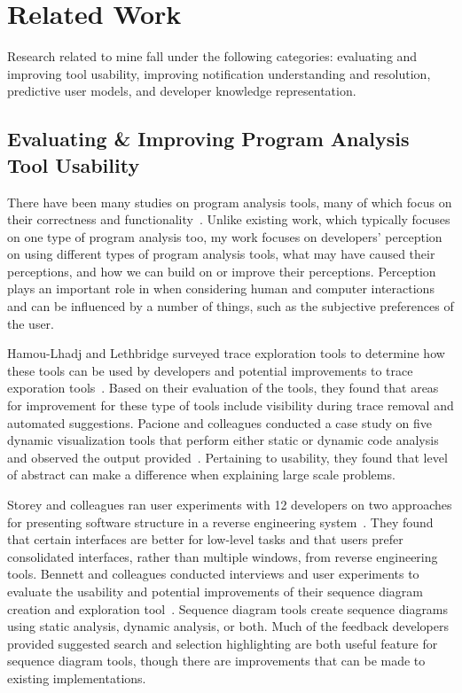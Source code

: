 \documentclass{llncs}
\begin{document}
\section{Related Work}
Research related to mine fall under the following categories: evaluating and improving tool usability, improving notification understanding and resolution, predictive user models, and developer knowledge representation.

\subsection{Evaluating \& Improving Program Analysis Tool Usability}

There have been many studies on program analysis tools, many of which focus on
their correctness and functionality~\cite{Ayewah:2008:FindBugs,Bessey:2010:Coverity,dugan2000developing,luk2005pin}.
Unlike existing work, which typically focuses on one type of program analysis too, my work focuses on developers' perception on 
using different types of program analysis tools, what may have caused their perceptions, and how we can build on or improve their perceptions. 
Perception plays an important role in when considering human and computer interactions~\cite{Dastani:2002:Perception} and
can be influenced by a number of things, such as the subjective preferences of
the user.

Hamou-Lhadj and Lethbridge surveyed trace exploration tools to determine how these tools 
can be used by developers and potential improvements to trace exporation tools~\cite{hamou2004survey}. 
Based on their evaluation of the tools, they found that areas 
for improvement for these type of tools include visibility during trace removal and automated suggestions.
Pacione and colleagues conducted a case study on five dynamic visualization tools that perform either static or dynamic code analysis and observed the output provided~\cite{pacione2003comparative}. Pertaining to usability, they found that level of abstract can make a difference when explaining large scale problems.

Storey and colleagues ran user experiments with 12 developers on two approaches for presenting software structure in a reverse engineering system~\cite{storey1997rigi}. They found that certain interfaces are better for low-level tasks and that users prefer consolidated interfaces, rather than multiple windows, from reverse engineering tools.
Bennett and colleagues conducted interviews and user experiments to evaluate the usability and potential improvements of their sequence diagram creation and exploration tool~\cite{bennett2008survey}. Sequence diagram tools create sequence diagrams using static analysis, dynamic analysis, or both.
Much of the feedback developers provided suggested search and selection highlighting are both useful feature for sequence diagram tools, though there are improvements that can be made to existing implementations.
\end{document}
